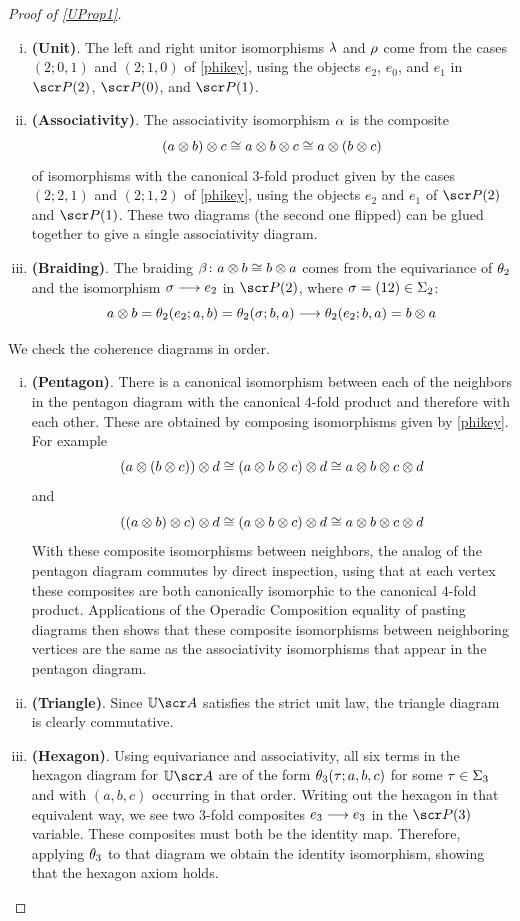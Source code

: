 \documentclass{amsart}
\theoremstyle{definition}
\numberwithin{equation}{section}
\begin{document}
\begin{proof} [Proof of \autoref{UProp1}]
\begin{enumerate}[(i)]
    \item \textbf{(Unit)}. The left and right unitor isomorphisms $\lambda$ and $\rho$ come from the cases $(2;0,1)$ and $(2;1,0)$ of \autoref{phikey}, using the objects $e_2$, $e_0$, and $e_1$ in $\sP(2)$, 
$\sP(0)$, and $\sP(1)$. 
    \item \textbf{(Associativity)}. The associativity isomorphism $\alpha$ is the composite 
    $$(a\otimes b)\otimes c \cong a\otimes b\otimes c \cong a\otimes(b\otimes c)$$
of isomorphisms with the canonical $3$-fold product given by the cases $(2;2,1)$ and $(2;1,2)$ of \autoref{phikey}, using the objects $e_2$ and $e_1$ of $\sP(2)$ and $\sP(1)$. These two diagrams (the second one flipped) can be glued together to give a single associativity diagram.
\item \textbf{(Braiding)}.  The braiding $\beta\colon a\otimes b \cong b\otimes a$ comes from the equivariance of $\theta_2$ and the isomorphism $\sigma \longrightarrow e_2$ in $\sP(2)$, where $\sigma = (12) \in \Sigma_2$:
$$a\otimes b = \theta_2(e_2; a, b) = \theta_2(\sigma; b, a)  \longrightarrow \theta_2(e_2; b,a) = b\otimes a$$
\end{enumerate}
We check the coherence diagrams in order.
\begin{enumerate}[(i)]
\item \textbf{(Pentagon)}. There is a canonical isomorphism between each of the neighbors in the pentagon diagram with the canonical $4$-fold product and therefore with each other.  These are obtained by composing isomorphisms given by \autoref{phikey}. For example
$$  (a\otimes (b\otimes c))\otimes d \cong (a\otimes b\otimes c)\otimes d \cong a\otimes b\otimes c\otimes d $$
and
$$ ((a\otimes b)\otimes c)\otimes d\cong (a\otimes b\otimes c)\otimes d  \cong a\otimes b\otimes c\otimes d$$
With these composite isomorphisms between neighbors, the analog of the pentagon diagram commutes by direct inspection, using that at each vertex these composites  are both canonically  isomorphic to  the canonical $4$-fold product.  Applications of the Operadic Composition equality of pasting diagrams then shows that  these composite isomorphisms between neighboring vertices are the same as the associativity isomorphisms that appear in the  pentagon diagram.
\item \textbf{(Triangle)}. Since $\mathbb{U}\sA$ satisfies the strict unit law, the triangle diagram is clearly commutative.
\item \textbf{(Hexagon)}. Using equivariance and associativity, all six terms in the hexagon diagram for $\bU\sA$ are of the form  $\theta_3(\tau; a, b, c)$ for some $\tau\in \Sigma_3$ and with $(a, b, c)$ occurring in that order. Writing out the hexagon in that equivalent way, we see two $3$-fold  composites $e_3 \longrightarrow e_3$ in the $\sP(3)$ variable.  These composites must both be the identity map. Therefore, applying $\theta_3$ to that diagram we obtain the identity isomorphism, showing that the hexagon axiom holds.

\end{enumerate}
\end{proof}
\end{document}

